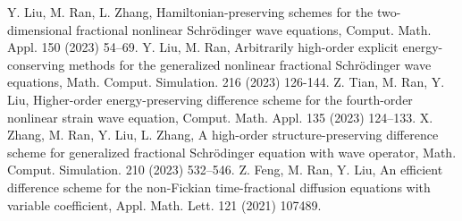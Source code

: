    \begin{mypaper}
      \begin{thebibliography}{99}  
       Y. Liu, M. Ran, L. Zhang, Hamiltonian-preserving schemes for the two-dimensional fractional nonlinear Schrödinger wave equations, Comput. Math. Appl. 150 (2023) 54–69.
       Y. Liu, M. Ran, Arbitrarily high-order explicit energy-conserving methods for the generalized nonlinear fractional Schrödinger wave equations, Math. Comput. Simulation. 216 (2023) 126-144.
       Z. Tian, M. Ran, Y. Liu, Higher-order energy-preserving difference scheme for the fourth-order nonlinear strain wave equation, Comput. Math. Appl. 135 (2023) 124–133.
       X. Zhang, M. Ran, Y. Liu, L. Zhang, A high-order structure-preserving difference scheme for generalized fractional Schrödinger equation with wave operator, Math. Comput. Simulation. 210 (2023) 532–546.
       Z. Feng, M. Ran, Y. Liu, An efficient difference scheme for the non-Fickian time-fractional diffusion equations with variable coefficient, Appl. Math. Lett. 121 (2021) 107489.
      \end{thebibliography}
   \end{mypaper}
   